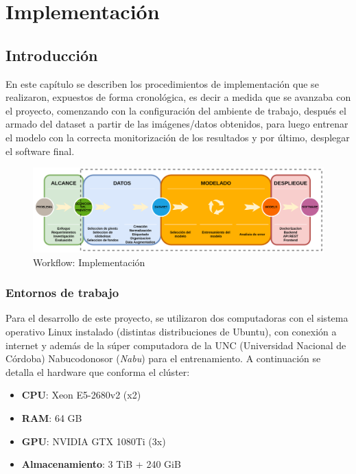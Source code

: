 \chapter{Implementación}
\label{Implementación}

\section{Introducción}
En este capítulo se describen los procedimientos de implementación que se realizaron, expuestos de forma cronológica, es decir a medida que se avanzaba con el proyecto, comenzando con la configuración del ambiente de trabajo, después el armado del dataset a partir de las imágenes/datos obtenidos, para luego entrenar el modelo con la correcta monitorización de los resultados y por último, desplegar el software final.

\begin{figure}
    \centering
    \includegraphics[width=1.2\textwidth,center]{img/Wokflow - datos_modelado_despliegue.drawio.png}
    \caption{Workflow: Implementación}
    \label{fig:workflow - implementacion}
\end{figure}

\subsection{Entornos de trabajo}
Para el desarrollo de este proyecto, se utilizaron dos computadoras con el sistema operativo Linux instalado (distintas distribuciones de Ubuntu), con conexión a internet y además de la súper computadora de la UNC (Universidad Nacional de Córdoba) Nabucodonosor (\textit{Nabu}) \cite{nabucodonosor} para el entrenamiento. A continuación se detalla el hardware que conforma el clúster:
\begin{itemize}
    \item \textbf{CPU}: Xeon E5-2680v2 (x2)
    \item \textbf{RAM}: 64 GB
    \item \textbf{GPU}: NVIDIA GTX 1080Ti (3x)
    \item \textbf{Almacenamiento}: 3 TiB + 240 GiB
\end{itemize}

